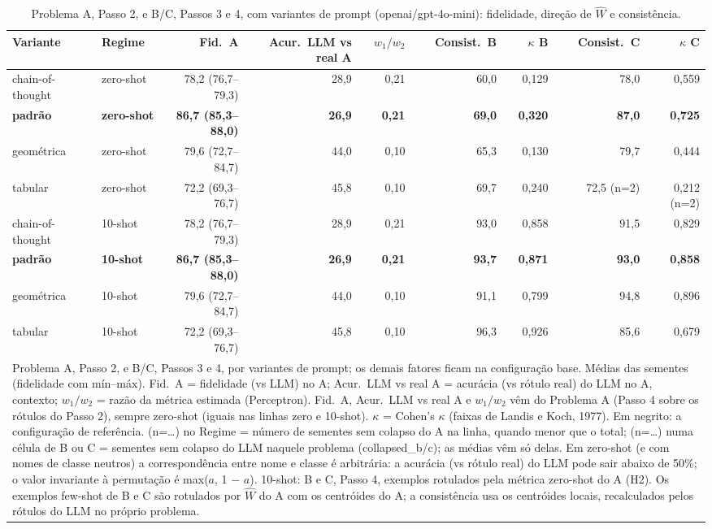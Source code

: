 \begin{table}[htbp]
\centering
\small
\caption{Problema A, Passo 2, e B/C, Passos 3 e 4, com variantes de prompt (openai/gpt-4o-mini): fidelidade, direção de $\hat{W}$ e consistência.}
\label{tab:bloco1_vies_variantes_prompt_gpt4mini}
\begin{tabular}{llrrrrrrr}
\toprule
Variante & Regime & Fid.\ A & Acur.\ LLM vs real A & $w_1/w_2$ & Consist.\ B & $\kappa$ B & Consist.\ C & $\kappa$ C \\
\midrule
chain-of-thought & zero-shot & 78,2 (76,7–79,3) & 28,9 & 0,21 & 60,0 & 0,129 & 78,0 & 0,559 \\
\textbf{padrão} & \textbf{zero-shot} & \textbf{86,7 (85,3–88,0)} & \textbf{26,9} & \textbf{0,21} & \textbf{69,0} & \textbf{0,320} & \textbf{87,0} & \textbf{0,725} \\
geométrica & zero-shot & 79,6 (72,7–84,7) & 44,0 & 0,10 & 65,3 & 0,130 & 79,7 & 0,444 \\
tabular & zero-shot & 72,2 (69,3–76,7) & 45,8 & 0,10 & 69,7 & 0,240 & 72,5 (n=2) & 0,212 (n=2) \\
\midrule
chain-of-thought & 10-shot & 78,2 (76,7–79,3) & 28,9 & 0,21 & 93,0 & 0,858 & 91,5 & 0,829 \\
\textbf{padrão} & \textbf{10-shot} & \textbf{86,7 (85,3–88,0)} & \textbf{26,9} & \textbf{0,21} & \textbf{93,7} & \textbf{0,871} & \textbf{93,0} & \textbf{0,858} \\
geométrica & 10-shot & 79,6 (72,7–84,7) & 44,0 & 0,10 & 91,1 & 0,799 & 94,8 & 0,896 \\
tabular & 10-shot & 72,2 (69,3–76,7) & 45,8 & 0,10 & 96,3 & 0,926 & 85,6 & 0,679 \\
\bottomrule
\multicolumn{9}{p{0.95\linewidth}}{\footnotesize Problema A, Passo 2, e B/C, Passos 3 e 4, por variantes de prompt; os demais fatores ficam na configuração base. Médias das sementes (fidelidade com mín–máx). Fid.\ A = fidelidade (vs LLM) no A; Acur.\ LLM vs real A = acurácia (vs rótulo real) do LLM no A, contexto; $w_1/w_2$ = razão da métrica estimada (Perceptron). Fid.\ A, Acur.\ LLM vs real A e $w_1/w_2$ vêm do Problema A (Passo 4 sobre os rótulos do Passo 2), sempre zero-shot (iguais nas linhas zero e 10-shot). $\kappa$ = Cohen's $\kappa$ (faixas de Landis e Koch, 1977). Em negrito: a configuração de referência. (n=…) no Regime = número de sementes sem colapso do A na linha, quando menor que o total; (n=…) numa célula de B ou C = sementes sem colapso do LLM naquele problema (collapsed\_b/c); as médias vêm só delas. Em zero-shot (e com nomes de classe neutros) a correspondência entre nome e classe é arbitrária: a acurácia (vs rótulo real) do LLM pode sair abaixo de 50\%; o valor invariante à permutação é max($a$, 1 $-$ $a$). 10-shot: B e C, Passo 4, exemplos rotulados pela métrica zero-shot do A (H2). Os exemplos few-shot de B e C são rotulados por $\hat{W}$ do A com os centróides do A; a consistência usa os centróides locais, recalculados pelos rótulos do LLM no próprio problema.} \\
\end{tabular}
\end{table}
